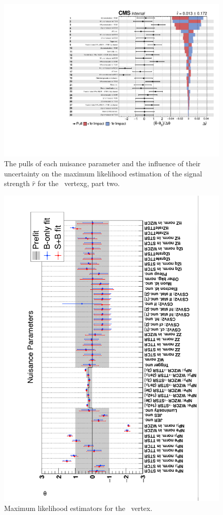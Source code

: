 \begin{figure}[htbp] 
	\centering
	\includegraphics[page=2,width=.99\linewidth,keepaspectratio]{6_Search/Figures/impact/171102Zct.pdf}
	\caption{The pulls of each nuisance parameter and the influence of their uncertainty on the maximum likelihood estimation of the signal strength $\hat{r}$ for the \Zct\ vertexg, part two.}
	\label{fig:impactsZct}
\end{figure}
\begin{figure}[htbp]
	\centering
	\includegraphics[width=1.\linewidth]{6_Search/Figures/impact/171102ZutMLE.pdf}
	\caption{Maximum likelihood estimators for the \Zut\ vertex.}
	\label{fig:171102zutmle}
\end{figure}
\clearpage
